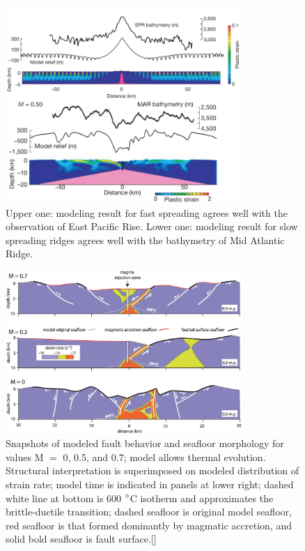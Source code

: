 \begin{figure}[H]
 \centering
  \includegraphics[width=0.8\textwidth]{./Figures/fig_Intro5_1.png}
 \caption{\small{Upper one: modeling result for fast spreading agrees well with the observation of East Pacific Rise. Lower one: modeling result for slow spreading ridges agrees well with the bathymetry of Mid Atlantic Ridge. \citep{Buck2005}}}
 \label{fig_Intro5_1}
\end{figure}

\begin{figure}[h]
 \centering
  \includegraphics[width=0.8\textwidth]{./Figures/fig_Intro_Tucholke2008.eps}
 \caption{Snapshots of modeled fault behavior and seafloor morphology for values M $=$ 0, 0.5, and 0.7; model allows thermal evolution. Structural interpretation is superimposed on modeled distribution of strain rate; model time is indicated in panels at lower right; dashed white line at bottom is 600 $\degree$C isotherm and approximates the brittle-ductile transition; dashed seafloor is original model seafloor, red seafloor is that formed dominantly by magmatic accretion, and solid bold seafloor is fault surface.[\citealp{Tucholke2008,Whitney2012}]}
 \label{fig_Intro6_1}
\end{figure}

